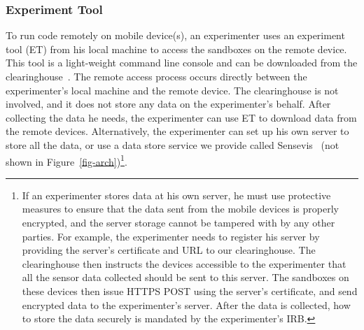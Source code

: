 \subsubsection{Experiment Tool}\label{sec-emt}

To run code remotely on mobile device(s), an experimenter uses an
experiment tool (ET) from his local machine 
to access the sandboxes on the remote device. This tool is a 
light-weight command line console and can
be downloaded from the clearinghouse~\cite{demo-kit}.
The remote access process
occurs directly between the experimenter's local machine and the 
remote device. The clearinghouse is not involved, and it does not store any
data on the experimenter's behalf. After collecting the data he needs, the
experimenter can use ET to download data from the remote devices. 
Alternatively, the experimenter can set up his own server to store all 
the data, or use a data store service we provide called Sensevis~\cite{sensevis} 
(not shown in Figure~\ref{fig-arch})\footnote{\scriptsize
If an experimenter stores data at his own server, he must use protective
measures to ensure that the data sent from the mobile devices is
properly encrypted, and the server storage cannot be tampered
with by any other parties. For example, the experimenter needs to register
his server by providing the server's certificate and URL to our
clearinghouse. The clearinghouse then instructs the devices
accessible to the experimenter that all the sensor data collected should be
sent to this server. The sandboxes on these devices then issue
HTTPS POST using the server's certificate, and send encrypted
data to the experimenter's server. After the data is collected, how to store
the data securely is mandated by the experimenter's IRB.}.

